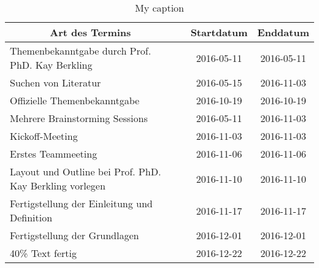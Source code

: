 
\begin{table}[]
\centering
\caption{My caption}
\label{my-label}
\begin{tabular}{|p{6cm}|p{3cm}|c|c|}
\hline
\multicolumn{1}{|c|}{\textbf{Art des Termins}}               & \centering{\textbf{Teilnehmer}}                                  &              \textbf{Startdatum} & \textbf{Enddatum} \\ \hline
Themenbekanntgabe durch Prof. PhD. Kay Berkling              & \centering{Kay Berkling, Marc Mahler}                            & 2016-05-11          & 2016-05-11        \\ \hline
Suchen von Literatur                                         & \centering{Marvin Zerulla}                                       & 2016-05-15          & 2016-11-03        \\ \hline
Offizielle Themenbekanntgabe                                 & \centering{Marc Mahler, Marvin Zerulla}                          & 2016-10-19          & 2016-10-19        \\ \hline
Mehrere Brainstorming  Sessions                              & \centering{Marc Mahler, Marvin Zerulla}                          & 2016-05-11          & 2016-11-03        \\ \hline
Kickoff-Meeting                                              & \centering{Marc Mahler, Marvin Zerulla, Prof. PhD. Kay Berkling} & 2016-11-03          & 2016-11-03        \\ \hline
Erstes Teammeeting                                           & \centering{Marc Mahler, Marvin Zerulla}                          & 2016-11-06          & 2016-11-06        \\ \hline
Layout und Outline bei Prof. PhD. Kay Berkling vorlegen      & \centering{Marc Mahler, Marvin Zerulla, Prof. PhD. Kay Berkling} & 2016-11-10          & 2016-11-10        \\ \hline
Fertigstellung der  Einleitung und  Definition               & \centering{Marc Mahler, Marvin Zerulla}                          & 2016-11-17          & 2016-11-17        \\ \hline
Fertigstellung der Grundlagen                                & \centering{Marc Mahler, Marvin Zerulla}                          & 2016-12-01          & 2016-12-01        \\ \hline
40\% Text fertig                                             & \centering{Marc Mahler, Marvin Zerulla}                          & 2016-12-22          & 2016-12-22        \\ \hline

\end{tabular}
\end{table}
